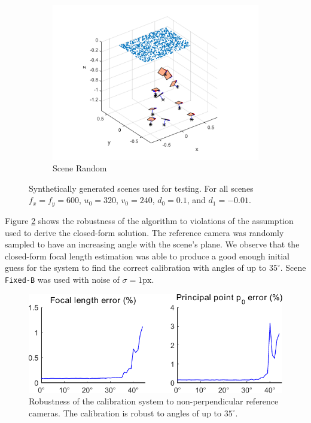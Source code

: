 \documentclass[10pt,twocolumn,letterpaper]{article}
\begin{document}
\begin{figure}
\begin{subfigure}[b]{0.32\linewidth}
\includegraphics[width=\linewidth]{images/synthCameraPosesRandom.pdf}
	\caption{Scene Random}
\end{subfigure}
\caption{Synthetically generated scenes used for testing. For all scenes $f_x=f_y=600$, $u_0=320$, $v_0=240$, $d_0=0.1$, and $d_1=-0.01$.}
\label{fig:synth_poses}
\end{figure}

Figure \ref{fig:results_normal_angle} shows the robustness of the algorithm to violations of the assumption used to derive the closed-form solution. The reference camera was randomly sampled to have an increasing angle with the scene's plane. We observe that the closed-form focal length estimation was able to produce a good enough initial guess for the system to find the correct calibration with angles of up to $35^\circ$.  Scene \texttt{Fixed-B} was used with noise of $\sigma=1\text{px}$.

\begin{figure}
\centering
\includegraphics[width=\linewidth]{images/resultsNormalAngle.pdf}
\caption{Robustness of the calibration system to non-perpendicular reference cameras. The calibration is robust to angles of up to $35^\circ$.}
\label{fig:results_normal_angle}
\end{figure}
\end{document}
